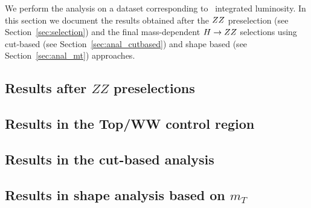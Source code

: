 We perform the analysis on a dataset corresponding to \intlumi\ integrated luminosity. 
In this section we document the results obtained after the $ZZ$ preselection (see 
Section~\ref{sec:selection}) and the final mass-dependent $H\to ZZ$ selections using cut-based 
(see Section~\ref{sec:anal_cutbased}) and shape based (see Section~\ref{sec:anal_mt}) approaches. 


\subsection{Results after $ZZ$ preselections}
\label{sec:results_zzpresel}

\clearpage

\subsection{Results in the Top/WW control region}
\label{sec:results_topww}

\clearpage

\subsection{Results in the cut-based analysis}
\label{sec:results_cut}

\clearpage

\subsection{Results in shape analysis based on $m_T$}
\label{sec:results_mtshape}

\clearpage
 
